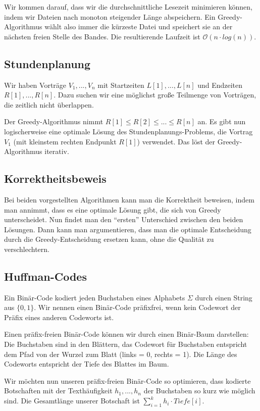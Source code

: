 \documentclass[12pt]{article}
\begin{document}
Wir kommen darauf, dass wir die durchschnittliche Lesezeit minimieren können, indem wir Dateien nach monoton steigender Länge abspeichern. Ein Greedy-Algorithmus wählt also immer die kürzeste Datei und speichert sie an der nächsten freien Stelle des Bandes. Die resultierende Laufzeit ist $\mathcal O(n \cdot log(n))$.

\subsection{Stundenplanung}
Wir haben Vorträge $V_1, ..., V_n$ mit Startzeiten $L[1], ..., L[n]$ und Endzeiten $R[1], ..., R[n]$. Dazu suchen wir eine möglichst große Teilmenge von Vorträgen, die zeitlich nicht überlappen.

Der Greedy-Algorithmus nimmt $R[1] \leq R[2] \leq ... \leq R[n]$ an. Es gibt nun logischerweise eine optimale Lösung des Stundenplanungs-Problems, die Vortrag $V_1$ (mit kleinstem rechten Endpunkt $R[1]$) verwendet. Das löst der Greedy-Algorithmus iterativ.

\subsection{Korrektheitsbeweis}
Bei beiden vorgestellten Algorithmen kann man die Korrektheit beweisen, indem man annimmt, dass es eine optimale Lösung gibt, die sich von Greedy unterscheidet. Nun findet man den \enquote{ersten} Unterschied zwischen den beiden Lösungen. Dann kann man argumentieren, dass man die optimale Entscheidung durch die Greedy-Entscheidung ersetzen kann, ohne die Qualität zu verschlechtern.

\subsection{Huffman-Codes}
Ein Binär-Code kodiert jeden Buchstaben eines Alphabets $\Sigma$ durch einen String aus $\{0,1\}$. Wir nennen einen Binär-Code präfixfrei, wenn kein Codewort der Präfix eines anderen Codeworts ist.

Einen präfix-freien Binär-Code können wir durch einen Binär-Baum darstellen: Die Buchstaben sind in den Blättern, das Codewort für Buchstaben entspricht dem Pfad von der Wurzel zum Blatt (links = 0, rechts = 1). Die Länge des Codeworts entspricht der Tiefe des Blattes im Baum.

Wir möchten nun unseren präfix-freien Binär-Code so optimieren, dass kodierte Botschaften mit der Texthäufigkeit $h_1, ..., h_n$ der Buchstaben so kurz wie möglich sind. Die Gesamtlänge unserer Botschaft ist $\sum_{i=1}^k h_i \cdot Tiefe[i]$.
\end{document}
